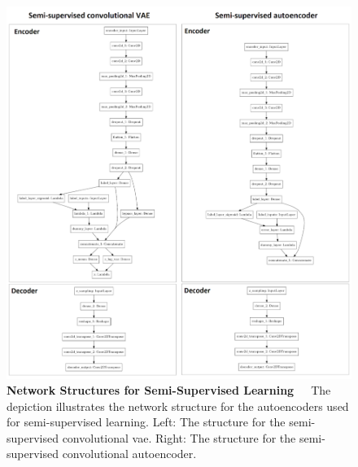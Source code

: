 \begin{figure}[!htb]
	\centering
	\includegraphics[scale=0.8]{Figures/chapter04/semi_supervised_network.png}
	\decoRule
	\caption[Semi-Supervised Learning Network Structures]{\textbf{Network Structures for Semi-Supervised Learning}~~~The depiction illustrates the network structure for the autoencoders used for semi-supervised learning. Left: The structure for the semi-supervised convolutional \acrshort{vae}. Right: The structure for the semi-supervised convolutional autoencoder.}
	\label{fig:SemiSupervisedNetworkStructures}
\end{figure}

